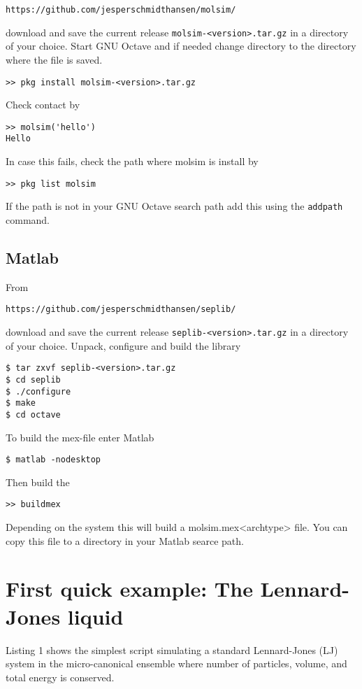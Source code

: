 \documentclass[11pt]{article}
\begin{document}
\begin{verbatim}
https://github.com/jesperschmidthansen/molsim/
\end{verbatim}

\noindent download and save the current release
\verb!molsim-<version>.tar.gz! in a directory of your choice. Start GNU
Octave and if needed change directory to the directory where the file is saved.
\begin{verbatim}
>> pkg install molsim-<version>.tar.gz 
\end{verbatim}
Check contact by
\begin{verbatim}
>> molsim('hello')
Hello 
\end{verbatim}
In case this fails, check the path where \textsf{molsim} is install by
\begin{verbatim}
>> pkg list molsim
\end{verbatim}
If the path is not in your GNU Octave search path add this using the
\verb!addpath! command.

\subsection{Matlab}
From
\begin{verbatim}
https://github.com/jesperschmidthansen/seplib/
\end{verbatim}
\noindent download and save the current release \verb!seplib-<version>.tar.gz!
in a directory of your choice. Unpack, configure and build the library
\begin{verbatim}
$ tar zxvf seplib-<version>.tar.gz
$ cd seplib
$ ./configure
$ make
$ cd octave
\end{verbatim}
To build the \textsf{mex}-file enter Matlab
\begin{verbatim}
$ matlab -nodesktop
\end{verbatim}
Then build the 
\begin{verbatim}
>> buildmex
\end{verbatim}
Depending on the system this will build a \textsf{molsim.mex<archtype>}
file. You can copy this file to a directory in your Matlab searce path.

\section{First quick example: The Lennard-Jones liquid}
Listing 1 shows the simplest script simulating a standard Lennard-Jones (LJ)
system in the micro-canonical ensemble where number of particles, volume, and
total energy is conserved.
\end{document}
